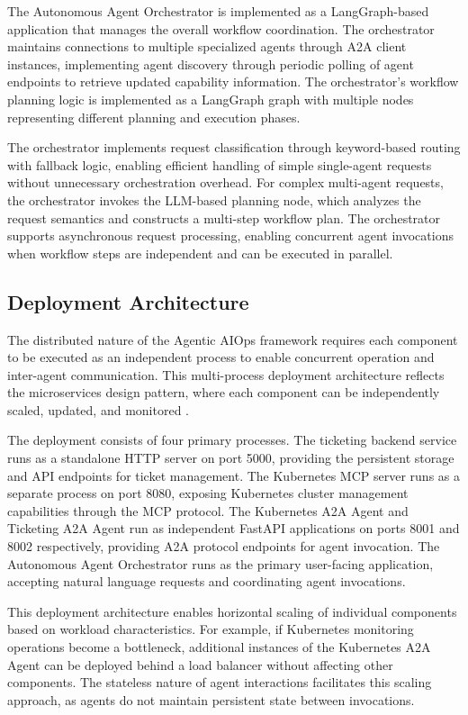 \documentclass{article}
\begin{document}
The Autonomous Agent Orchestrator is implemented as a LangGraph-based application that manages the overall workflow coordination. The orchestrator maintains connections to multiple specialized agents through A2A client instances, implementing agent discovery through periodic polling of agent endpoints to retrieve updated capability information. The orchestrator's workflow planning logic is implemented as a LangGraph graph with multiple nodes representing different planning and execution phases.

The orchestrator implements request classification through keyword-based routing with fallback logic, enabling efficient handling of simple single-agent requests without unnecessary orchestration overhead. For complex multi-agent requests, the orchestrator invokes the LLM-based planning node, which analyzes the request semantics and constructs a multi-step workflow plan. The orchestrator supports asynchronous request processing, enabling concurrent agent invocations when workflow steps are independent and can be executed in parallel.

\subsection{Deployment Architecture}

The distributed nature of the Agentic AIOps framework requires each component to be executed as an independent process to enable concurrent operation and inter-agent communication. This multi-process deployment architecture reflects the microservices design pattern, where each component can be independently scaled, updated, and monitored \cite{newman2015}.

The deployment consists of four primary processes. The ticketing backend service runs as a standalone HTTP server on port 5000, providing the persistent storage and API endpoints for ticket management. The Kubernetes MCP server runs as a separate process on port 8080, exposing Kubernetes cluster management capabilities through the MCP protocol. The Kubernetes A2A Agent and Ticketing A2A Agent run as independent FastAPI applications on ports 8001 and 8002 respectively, providing A2A protocol endpoints for agent invocation. The Autonomous Agent Orchestrator runs as the primary user-facing application, accepting natural language requests and coordinating agent invocations.

This deployment architecture enables horizontal scaling of individual components based on workload characteristics. For example, if Kubernetes monitoring operations become a bottleneck, additional instances of the Kubernetes A2A Agent can be deployed behind a load balancer without affecting other components. The stateless nature of agent interactions facilitates this scaling approach, as agents do not maintain persistent state between invocations.
\end{document}
